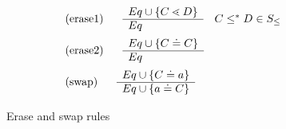 \begin{figure}
\begin{align*}
&\begin{tabular}[t]{ll}
      (erase1)  & $ 
      \begin{array}[c]{ll}
        \begin{array}[c]{l}
          Eq \cup \set{C \lessdot D}\\
          \hline
          Eq
        \end{array}
        & C \leq^* D \in S_\leq
      \end{array}$\\
          \end{tabular}\\
&\begin{tabular}[t]{ll}
      (erase2)  & $ 
      \begin{array}[c]{ll}
        \begin{array}[c]{l}
          Eq \cup \set{C \doteq C}\\
          \hline
          Eq
        \end{array}
      \end{array}$\\
          \end{tabular}\\
    &      \begin{tabular}[t]{ll}
       (swap) & $
            \begin{array}[c]{ll}
              \begin{array}[c]{l}
                Eq \cup \set{C \doteq a}\\
                \hline
                Eq \cup \set{a \doteq C}
              \end{array}
            \end{array}$
          \end{tabular}
\end{align*}
\caption{Erase and swap rules}\label{fig:fgjerase-rules}
\end{figure}